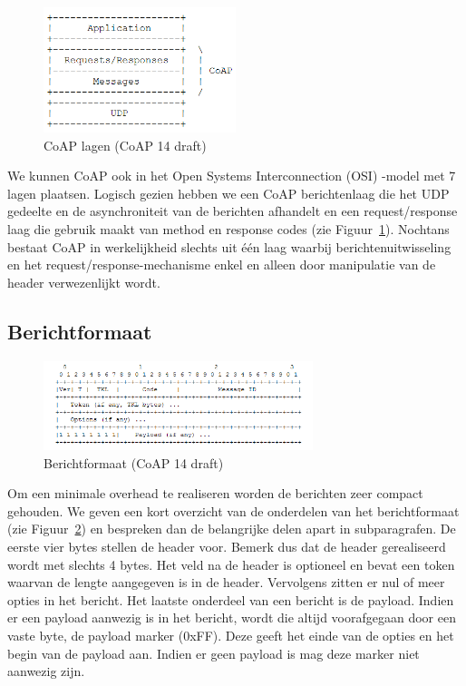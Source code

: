 \begin{figure}
\vspace{-10pt}
\includegraphics[width=0.5\textwidth]{fig/CoAPLaag}
\vspace{-30pt}
\caption{CoAP lagen (CoAP 14 draft)}
\vspace{-5pt}
\label{fig:CoAPLaag}
\end{figure}
We kunnen CoAP ook in het Open Systems Interconnection (OSI) -model  met 7 lagen plaatsen. Logisch gezien hebben we een CoAP berichtenlaag die het UDP gedeelte en de asynchroniteit van de berichten afhandelt en een request/response laag die gebruik maakt van method en response codes (zie Figuur~\ref{fig:CoAPLaag}). Nochtans bestaat CoAP in werkelijkheid slechts uit \'{e}\'{e}n laag waarbij berichtenuitwisseling en het request/response-mechanisme enkel en alleen door manipulatie van de header verwezenlijkt wordt.

\subsection{Berichtformaat}

\begin{figure}
\vspace{-20pt}
\includegraphics[width=0.7\textwidth]{fig/CoAPMessageFormat}
\vspace{-30pt}
\caption{Berichtformaat (CoAP 14 draft)}
\vspace{-10pt}
\label{fig:CoAPMessageFormat}
\end{figure}
Om een minimale overhead te realiseren worden de berichten zeer compact gehouden. We geven een kort overzicht van de onderdelen van het berichtformaat (zie Figuur~\ref{fig:CoAPMessageFormat}) en bespreken dan de belangrijke delen apart in subparagrafen. De eerste vier bytes stellen de header voor. Bemerk dus dat de header gerealiseerd wordt met slechts 4 bytes. Het veld na de header is optioneel en bevat een token waarvan de lengte aangegeven is in de header. Vervolgens zitten er nul of meer opties in het bericht.
Het laatste onderdeel van een bericht is de payload. Indien er een payload aanwezig is in het bericht, wordt die altijd voorafgegaan door een vaste byte, de payload marker (0xFF). Deze geeft het einde van de opties en het begin van de payload aan. Indien er geen payload is mag deze marker niet aanwezig zijn.


